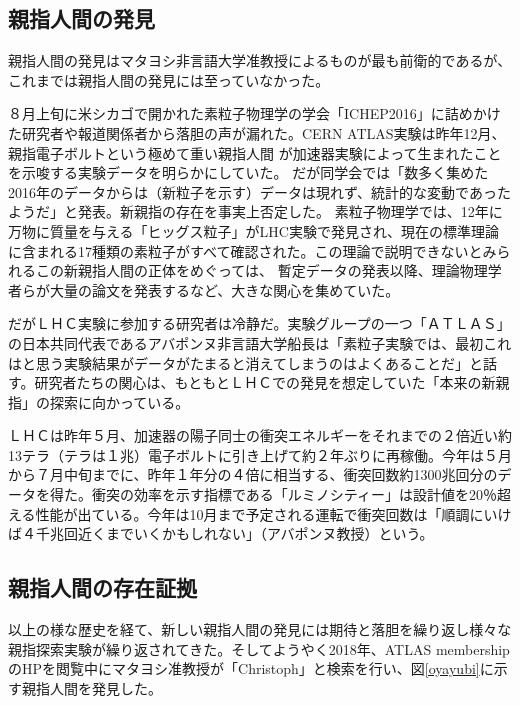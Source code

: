 \documentclass[12pt]{jsarticle}
\begin{document}
\subsection{親指人間の発見}
親指人間の発見はマタヨシ非言語大学准教授によるものが最も前衛的であるが、これまでは親指人間の発見には至っていなかった。\par
８月上旬に米シカゴで開かれた素粒子物理学の学会「ICHEP2016」に詰めかけた研究者や報道関係者から落胆の声が漏れた。CERN ATLAS実験は昨年12月、親指電子ボルトという極めて重い親指人間
が加速器実験によって生まれたことを示唆する実験データを明らかにしていた。
だが同学会では「数多く集めた2016年のデータからは（新粒子を示す）データは現れず、統計的な変動であったようだ」と発表。新親指の存在を事実上否定した。
素粒子物理学では、12年に万物に質量を与える「ヒッグス粒子」がLHC実験で発見され、現在の標準理論に含まれる17種類の素粒子がすべて確認された。この理論で説明できないとみられるこの新親指人間の正体をめぐっては、
暫定データの発表以降、理論物理学者らが大量の論文を発表するなど、大きな関心を集めていた。\par

だがＬＨＣ実験に参加する研究者は冷静だ。実験グループの一つ「ＡＴＬＡＳ」の日本共同代表であるアバポンヌ非言語大学船長は「素粒子実験では、最初これはと思う実験結果がデータがたまると消えてしまうのはよくあることだ」と話す。研究者たちの関心は、もともとＬＨＣでの発見を想定していた「本来の新親指」の探索に向かっている。\par

ＬＨＣは昨年５月、加速器の陽子同士の衝突エネルギーをそれまでの２倍近い約13テラ（テラは１兆）電子ボルトに引き上げて約２年ぶりに再稼働。今年は５月から７月中旬までに、昨年１年分の４倍に相当する、衝突回数約1300兆回分のデータを得た。衝突の効率を示す指標である「ルミノシティー」は設計値を20％超える性能が出ている。今年は10月まで予定される運転で衝突回数は「順調にいけば４千兆回近くまでいくかもしれない」（アバポンヌ教授）という。

\subsection{親指人間の存在証拠}
以上の様な歴史を経て、新しい親指人間の発見には期待と落胆を繰り返し様々な親指探索実験が繰り返されてきた。そしてようやく2018年、ATLAS membershipのHPを閲覧中にマタヨシ准教授が「Christoph」と検索を行い、図\ref{oyayubi}に示す親指人間を発見した。
\end{document}
